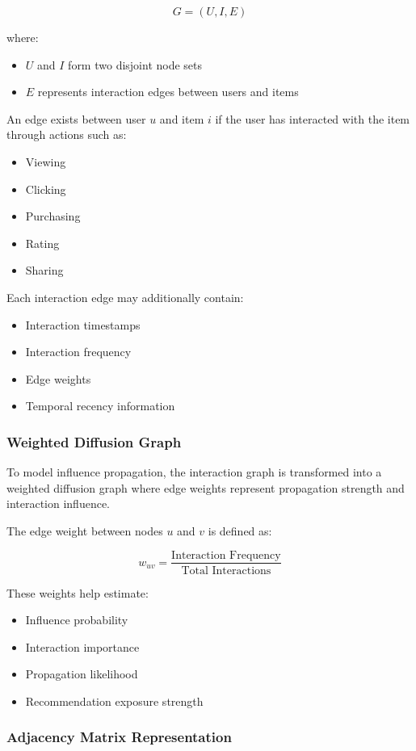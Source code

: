\documentclass{article}
\begin{document}
$$
G = (U, I, E)
$$

where:
\begin{itemize}
\item $U$ and $I$ form two disjoint node sets
\item $E$ represents interaction edges between users and items
\end{itemize}

An edge exists between user $u$ and item $i$ if the user has interacted with the item through actions such as:
\begin{itemize}
\item Viewing
\item Clicking
\item Purchasing
\item Rating
\item Sharing
\end{itemize}

Each interaction edge may additionally contain:
\begin{itemize}
\item Interaction timestamps
\item Interaction frequency
\item Edge weights
\item Temporal recency information
\end{itemize}

\subsubsection{Weighted Diffusion Graph}

To model influence propagation, the interaction graph is transformed into a weighted diffusion graph where edge weights represent propagation strength and interaction influence.

The edge weight between nodes $u$ and $v$ is defined as:

$$
w_{uv} = \frac{\text{Interaction Frequency}}{\text{Total Interactions}}
$$

These weights help estimate:
\begin{itemize}
\item Influence probability
\item Interaction importance
\item Propagation likelihood
\item Recommendation exposure strength
\end{itemize}

\subsubsection{Adjacency Matrix Representation}
\end{document}
